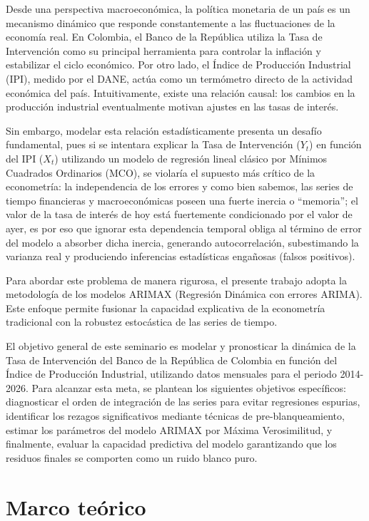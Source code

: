 \documentclass[11pt,letterpaper]{article}
\begin{document}
Desde una perspectiva macroeconómica, la política monetaria de un país es un mecanismo dinámico que responde constantemente a las fluctuaciones de la economía real. En Colombia, el Banco de la República utiliza la Tasa de Intervención como su principal herramienta para controlar la inflación y estabilizar el ciclo económico. Por otro lado, el Índice de Producción Industrial (IPI), medido por el DANE, actúa como un termómetro directo de la actividad económica del país. Intuitivamente, existe una relación causal: los cambios en la producción industrial eventualmente motivan ajustes en las tasas de interés. 

Sin embargo, modelar esta relación estadísticamente presenta un desafío fundamental, pues si se intentara explicar la Tasa de Intervención ($Y_t$) en función del IPI ($X_t$) utilizando un modelo de regresión lineal clásico por Mínimos Cuadrados Ordinarios (MCO), se violaría el supuesto más crítico de la econometría: la independencia de los errores y como bien sabemos, las series de tiempo financieras y macroeconómicas poseen una fuerte inercia o ``memoria''; el valor de la tasa de interés de hoy está fuertemente condicionado por el valor de ayer, es por eso que ignorar esta dependencia temporal obliga al término de error del modelo a absorber dicha inercia, generando autocorrelación, subestimando la varianza real y produciendo inferencias estadísticas engañosas (falsos positivos).

Para abordar este problema de manera rigurosa, el presente trabajo adopta la metodología de los modelos ARIMAX (Regresión Dinámica con errores ARIMA). Este enfoque permite fusionar la capacidad explicativa de la econometría tradicional con la robustez estocástica de las series de tiempo. 

El objetivo general de este seminario es modelar y pronosticar la dinámica de la Tasa de Intervención del Banco de la República de Colombia en función del Índice de Producción Industrial, utilizando datos mensuales para el periodo 2014-2026. Para alcanzar esta meta, se plantean los siguientes objetivos específicos: diagnosticar el orden de integración de las series para evitar regresiones espurias, identificar los rezagos significativos mediante técnicas de pre-blanqueamiento, estimar los parámetros del modelo ARIMAX por Máxima Verosimilitud, y finalmente, evaluar la capacidad predictiva del modelo garantizando que los residuos finales se comporten como un ruido blanco puro.

\section{Marco teórico}
\end{document}
